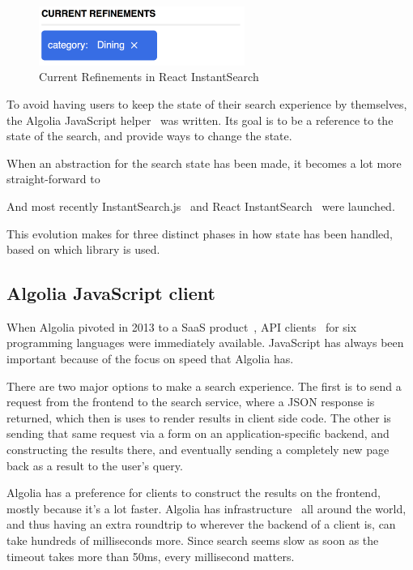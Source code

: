 \begin{figure}[H]
\label{figure:js-helper-state}
  \centering
  \includegraphics[width=0.6\textwidth]{../assets/current-refinements.png}
  \caption{Current Refinements in React InstantSearch\cite{ris-current-refinements}}
\end{figure}

To avoid having users to keep the state of their search experience by themselves, the Algolia JavaScript helper~\cite{algolia-js-helper} was written. Its goal is to be a reference to the state of the search, and provide ways to change the state.

When an abstraction for the search state has been made, it becomes a lot more straight-forward to 

And most recently InstantSearch.js~\cite{instantsearch-js} and React InstantSearch~\cite{react-instantsearch} were launched. %

This evolution makes for three distinct phases in how state has been handled, based on which library is used.

\subsection{Algolia JavaScript client} %
\label{sub:algolia_js_client}

When Algolia pivoted in 2013 to a SaaS product~\cite{algolia-blog-saas}, API clients~\cite{algolia-blog-lauch} for six programming languages were immediately available. JavaScript has always been important because of the focus on speed that Algolia has.

There are two major options to make a search experience. The first is to send a request from the frontend to the search service, where a JSON response is returned, which then is uses to render results in client side code. The other is sending that same request via a form on an application-specific backend, and constructing the results there, and eventually sending a completely new page back as a result to the user's query.

Algolia has a preference for clients to construct the results on the frontend, mostly because it's a lot faster. Algolia has infrastructure~\cite{algolia-infra} all around the world, and thus having an extra roundtrip to wherever the backend of a client is, can take hundreds of milliseconds more. Since search seems slow as soon as the timeout takes more than 50ms, every millisecond matters.

